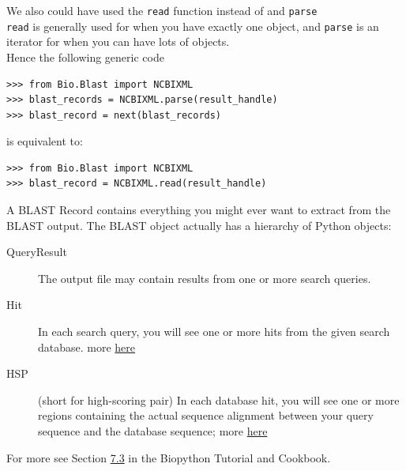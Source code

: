 \documentclass[xcolor=svgnames]{beamer}
\newcommand{\nl}{\\[1em]}
\begin{document}
\begin{frame}[fragile]
We also could have used the {\tt read} function instead of  and {\tt parse}\nl
{\tt read} is generally used for when you have exactly one object, and {\tt parse} is an iterator for when you can have lots of objects.  \nl

Hence the following generic code
\begin{Verbatim}[xleftmargin=.5in]
>>> from Bio.Blast import NCBIXML
>>> blast_records = NCBIXML.parse(result_handle)
>>> blast_record = next(blast_records)
\end{Verbatim}
is equivalent to:
\begin{Verbatim}[xleftmargin=.5in]
>>> from Bio.Blast import NCBIXML
>>> blast_record = NCBIXML.read(result_handle)
\end{Verbatim}
\end{frame}



\begin{frame}
A BLAST Record contains everything you might ever want to extract from the BLAST output. The BLAST object actually has a hierarchy of Python objects:
\begin{description}
\item[QueryResult] The output file may contain results from one or more search queries.
\item[Hit] In each search query, you will see one or more hits from the given search database.  more \href{http://biopython.org/DIST/docs/api/Bio.Blast.Record.Alignment-class.html}{here}
\item[HSP] (short for high-scoring pair) In each database hit, you will see one or more regions containing the actual sequence alignment between your query sequence and the database sequence; more \href{http://biopython.org/DIST/docs/api/Bio.Blast.Record.HSP-class.html}{here}
\end{description}
For more see Section \href{http://biopython.org/DIST/docs/tutorial/Tutorial.html\#htoc102}{7.3} in the Biopython Tutorial and Cookbook.


\end{frame}
\end{document}
